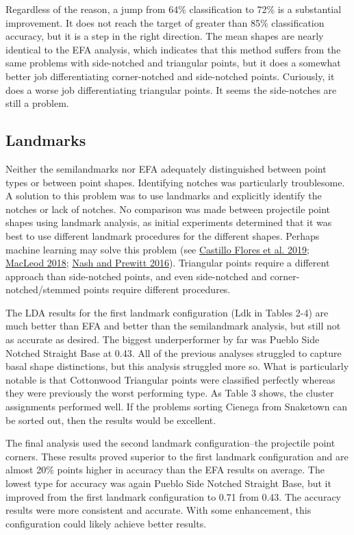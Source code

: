 \documentclass{article}
\begin{document}
Regardless of the reason, a jump from 64\% classification to 72\% is a
substantial improvement. It does not reach the target of greater than
85\% classification accuracy, but it is a step in the right direction.
The mean shapes are nearly identical to the EFA analysis, which
indicates that this method suffers from the same problems with
side-notched and triangular points, but it does a somewhat better job
differentiating corner-notched and side-notched points. Curiously, it
does a worse job differentiating triangular points. It seems the
side-notches are still a problem.

\hypertarget{landmarks}{%
\subsection{Landmarks}\label{landmarks}}

Neither the semilandmarks nor EFA adequately distinguished between point
types or between point shapes. Identifying notches was particularly
troublesome. A solution to this problem was to use landmarks and
explicitly identify the notches or lack of notches. No comparison was
made between projectile point shapes using landmark analysis, as initial
experiments determined that it was best to use different landmark
procedures for the different shapes. Perhaps machine learning may solve
this problem (see
\protect\hyperlink{ref-Castillo_Flores2019-cs}{Castillo Flores et al.
2019}; \protect\hyperlink{ref-MacLeod2018-aj}{MacLeod 2018};
\protect\hyperlink{ref-Nash2016-mc}{Nash and Prewitt 2016}). Triangular
points require a different approach than side-notched points, and even
side-notched and corner-notched/stemmed points require different
procedures.

The LDA results for the first landmark configuration (Ldk in Tables 2-4)
are much better than EFA and better than the semilandmark analysis, but
still not as accurate as desired. The biggest underperformer by far was
Pueblo Side Notched Straight Base at 0.43. All of the previous analyses
struggled to capture basal shape distinctions, but this analysis
struggled more so. What is particularly notable is that Cottonwood
Triangular points were classified perfectly whereas they were previously
the worst performing type. As Table 3 shows, the cluster assignments
performed well. If the problems sorting Cienega from Snaketown can be
sorted out, then the results would be excellent.

The final analysis used the second landmark configuration--the
projectile point corners. These results proved superior to the first
landmark configuration and are almost 20\% points higher in accuracy
than the EFA results on average. The lowest type for accuracy was again
Pueblo Side Notched Straight Base, but it improved from the first
landmark configuration to 0.71 from 0.43. The accuracy results were more
consistent and accurate. With some enhancement, this configuration could
likely achieve better results.
\end{document}
